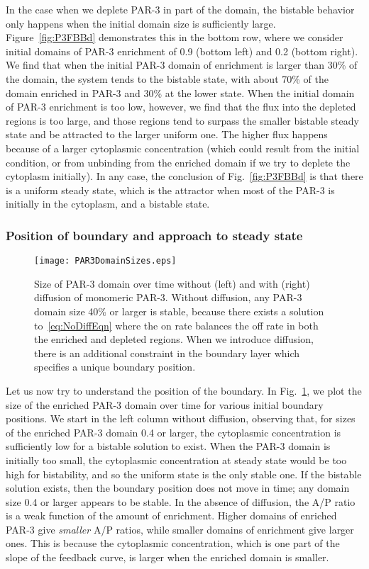 \documentclass[11pt]{article}
\newcommand{\6}[1]{#1_{\text{6}}}
\newcommand{\3}[1]{#1_{\text{3}}}
\begin{document}
In the case when we deplete PAR-3 in part of the domain, the bistable behavior only happens when the initial domain size is sufficiently large. Figure\ \ref{fig:P3FBBd} demonstrates this in the bottom row, where we consider initial domains of PAR-3 enrichment of 0.9 (bottom left) and 0.2 (bottom right). We find that when the initial PAR-3 domain of enrichment is larger than 30\% of the domain, the system tends to the bistable state, with about 70\% of the domain enriched in PAR-3 and 30\% at the lower state. When the initial domain of PAR-3 enrichment is too low, however, we find that the flux into the depleted regions is too large, and those regions tend to surpass the smaller bistable steady state and be attracted to the larger uniform one. The higher flux happens because of a larger cytoplasmic concentration (which could result from the initial condition, or from unbinding from the enriched domain if we try to deplete the cytoplasm initially). In any case, the conclusion of Fig.\ \ref{fig:P3FBBd} is that there is a uniform steady state, which is the attractor when most of the PAR-3 is initially in the cytoplasm, and a bistable state.

\subsubsection{Position of boundary and approach to steady state}

\begin{figure}
\centering
\texttt{[image: PAR3DomainSizes.eps]}
\caption{\label{fig:WWoDiff}Size of PAR-3 domain over time without (left) and with (right) diffusion of monomeric PAR-3. Without diffusion, any PAR-3 domain size 40\% or larger is stable, because there exists a solution to\ \eqref{eq:NoDiffEqn} where the on rate balances the off rate in both the enriched and depleted regions. When we introduce diffusion, there is an additional constraint in the boundary layer which specifies a unique boundary position.}
\end{figure}

Let us now try to understand the position of the boundary. In Fig.\ \ref{fig:WWoDiff}, we plot the size of the enriched PAR-3 domain over time for various initial boundary positions. We start in the left column without diffusion, observing that, for sizes of the enriched PAR-3 domain 0.4 or larger, the cytoplasmic concentration is sufficiently low for a bistable solution to exist. When the PAR-3 domain is initially too small, the cytoplasmic concentration at steady state would be too high for bistability, and so the uniform state is the only stable one. If the bistable solution exists, then the boundary position does not move in time; any domain size 0.4 or larger appears to be stable. In the absence of diffusion, the A/P ratio is a weak function of the amount of enrichment. Higher domains of enriched PAR-3 give \emph{smaller} A/P ratios, while smaller domains of enrichment give larger ones. This is because the cytoplasmic concentration, which is one part of the slope of the feedback curve, is larger when the enriched domain is smaller. 
\end{document}
